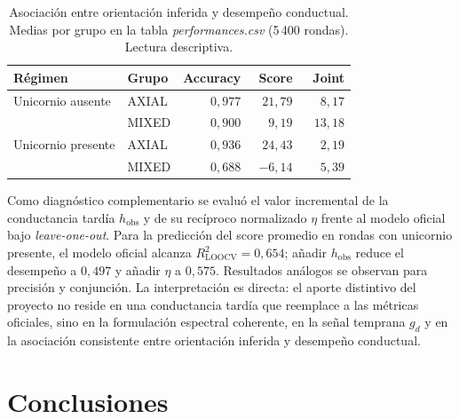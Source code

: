 \documentclass[journal]{IEEEtran}
\begin{document}
\begin{table}[t]
\centering
\caption{Asociación entre orientación inferida y desempeño conductual. Medias por grupo en la tabla \emph{performances.csv} (5\,400 rondas). Lectura descriptiva.}
\label{tab:transfer}
\begin{tabular}{@{}llrrr@{}}
\toprule
\textbf{Régimen} & \textbf{Grupo} & \textbf{Accuracy} & \textbf{Score} & \textbf{Joint} \\
\midrule
Unicornio ausente  & AXIAL  & $0{,}977$ & $21{,}79$ & $\phantom{-}8{,}17$ \\
                   & MIXED  & $0{,}900$ & $\phantom{-}9{,}19$  & $13{,}18$ \\
\addlinespace
Unicornio presente & AXIAL  & $0{,}936$ & $24{,}43$ & $\phantom{-}2{,}19$ \\
                   & MIXED  & $0{,}688$ & $-6{,}14$ & $\phantom{-}5{,}39$ \\
\bottomrule
\end{tabular}
\end{table}

Como diagnóstico complementario se evaluó el valor incremental de la conductancia tardía $h_{\mathrm{obs}}$ y de su recíproco normalizado $\eta$ frente al modelo oficial bajo \emph{leave-one-out}. Para la predicción del score promedio en rondas con unicornio presente, el modelo oficial alcanza $R^2_{\mathrm{LOOCV}} = 0{,}654$; añadir $h_{\mathrm{obs}}$ reduce el desempeño a $0{,}497$ y añadir $\eta$ a $0{,}575$. Resultados análogos se observan para precisión y conjunción. La interpretación es directa: el aporte distintivo del proyecto no reside en una conductancia tardía que reemplace a las métricas oficiales, sino en la formulación espectral coherente, en la señal temprana $g_d$ y en la asociación consistente entre orientación inferida y desempeño conductual.

\section{Conclusiones}\label{sec:conclusiones}
\end{document}
